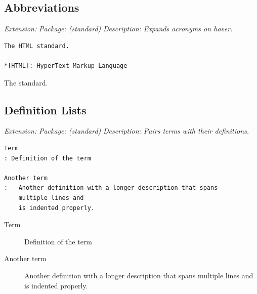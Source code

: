 \documentclass[a4paper,twoside]{article}
\begin{document}
\subsection{Abbreviations}
\emph{Extension: }
\emph{Package:  (standard)}
\emph{Description: Expands acronyms on hover.}
\begin{tscode}[lang=md, engine=pygments]
\begin{Verbatim}[commandchars=\\\{\},breaklines, breakanywhere, commandchars=\\\{\}]
The HTML standard.

*[HTML]: HyperText Markup Language
\end{Verbatim}
\end{tscode}
\begin{displayquote}
The  standard.
\end{displayquote}
\subsection{Definition Lists}
\emph{Extension: }
\emph{Package:  (standard)}
\emph{Description: Pairs terms with their definitions.}
\begin{tscode}[lang=md, engine=pygments]
\begin{Verbatim}[commandchars=\\\{\},breaklines, breakanywhere, commandchars=\\\{\}]
Term
: Definition of the term

Another term
:   Another definition with a longer description that spans
    multiple lines and
    is indented properly.
\end{Verbatim}
\end{tscode}
\begin{displayquote}
\begin{description}
\item[{Term}] Definition of the term
\item[{Another term}] Another definition with a longer description that spans
multiple lines and
is indented properly.
\end{description}
\end{displayquote}
\end{document}
